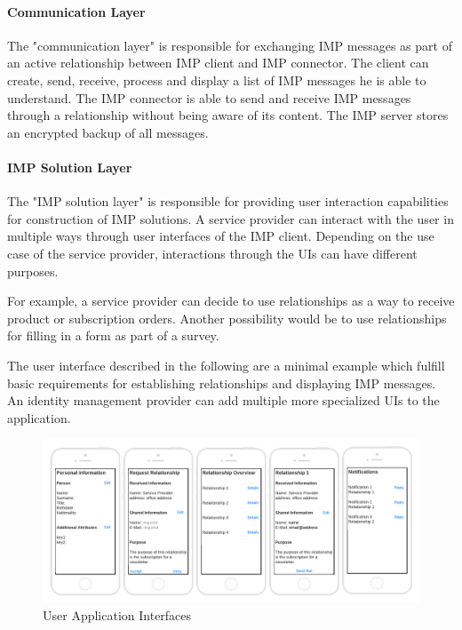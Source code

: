 \paragraph{Communication Layer}

The "communication layer" is responsible for exchanging IMP messages as part of an active relationship between IMP client and IMP connector. The client can create, send, receive, process and display a list of IMP messages he is able to understand. The IMP connector is able to send and receive IMP messages through a relationship without being aware of its content. The IMP server stores an encrypted backup of all messages.

\paragraph{IMP Solution Layer}

The "IMP solution layer" is responsible for providing user interaction capabilities for construction of IMP solutions. A service provider can interact with the user in multiple ways through user interfaces of the IMP client. Depending on the use case of the service provider, interactions through the UIs can have different purposes.

For example, a service provider can decide to use relationships as a way to receive product or subscription orders. Another possibility would be to use relationships for filling in a form as part of a survey.

The user interface described in the following are a minimal example which fulfill basic requirements for establishing relationships and displaying IMP messages. An identity management provider can add multiple more specialized UIs to the application.

\begin{figure}[h]
\caption{User Application Interfaces}
    \centering
    \includegraphics[scale=0.2]{Diagrams/UI.png}
\end{figure}

